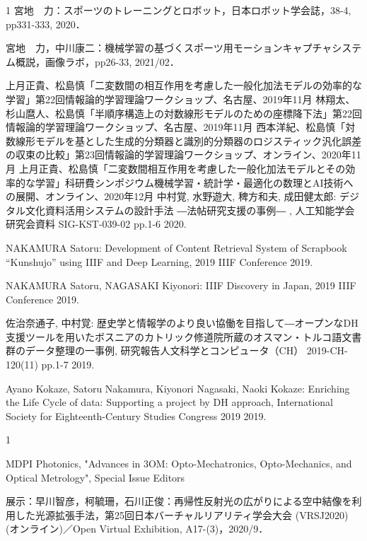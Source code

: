 \begin{発表}{1}
宮地　力：スポーツのトレーニングとロボット，日本ロボット学会誌，38-4, pp331-333, 2020．

宮地　力，中川康二：機械学習の基づくスポーツ用モーションキャプチャシステム概説，画像ラボ，pp26-33, 2021/02．

 上月正貴、松島慎「二変数間の相互作用を考慮した一般化加法モデルの効率的な学習」第22回情報論的学習理論ワークショップ、名古屋、2019年11月
 林翔太、杉山麿人、松島慎「半順序構造上の対数線形モデルのための座標降下法」第22回情報論的学習理論ワークショップ、名古屋、2019年11月
 西本洋紀、松島慎「対数線形モデルを基とした生成的分類器と識別的分類器のロジスティック汎化誤差の収束の比較」第23回情報論的学習理論ワークショップ、オンライン、2020年11月
 上月正貴、松島慎「二変数間相互作用を考慮した一般化加法モデルとその効率的な学習」科研費シンポジウム機械学習・統計学・最適化の数理とAI技術への展開、オンライン、2020年12月
中村覚, 水野遊大, 稗方和夫, 成田健太郎:
 デジタル文化資料活用システムの設計手法 ―法帖研究支援の事例― ,  人工知能学会研究会資料 SIG-KST-039-02 pp.1-6 2020.

NAKAMURA Satoru:
 Development of Content Retrieval System of Scrapbook “Kunshujo” using IIIF and Deep Learning,  2019 IIIF Conference 2019.

NAKAMURA Satoru, NAGASAKI Kiyonori:
 IIIF Discovery in Japan,  2019 IIIF Conference 2019.

佐治奈通子, 中村覚:
 歴史学と情報学のより良い協働を目指して―オープンなDH支援ツールを用いたボスニアのカトリック修道院所蔵のオスマン・トルコ語文書群のデータ整理の一事例,  研究報告人文科学とコンピュータ（CH） 2019-CH-120(11) pp.1-7 2019.

Ayano Kokaze, Satoru Nakamura, Kiyonori Nagasaki, Naoki Kokaze:
 Enriching the Life Cycle of data: Supporting a project by DH approach,  International Society for Eighteenth-Century Studies Congress 2019 2019.

\end{発表}

\begin{特記}{1}

MDPI Photonics, "Advances in 3OM: Opto-Mechatronics, Opto-Mechanics, and Optical Metrology", Special Issue Editors

展示：早川智彦，柯毓珊，石川正俊：再帰性反射光の広がりによる空中結像を利用した光源拡張手法，第25回日本バーチャルリアリティ学会大会 (VRSJ2020) (オンライン)／Open Virtual Exhibition, A17-(3)，2020/9．

\end{特記}

